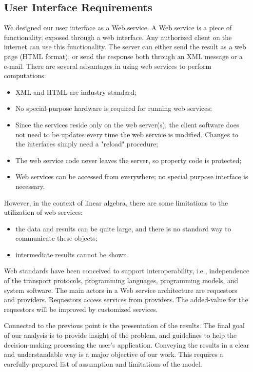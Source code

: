 \documentclass[11pt,relax]{SANDreport}
\begin{document}
\subsection{User Interface Requirements}

We designed our user interface as a Web service.
A Web service is a piece of functionality, exposed through a web interface.
Any authorized client on the internet can use this functionality. The server
can either send the result as a web page (HTML format), or send the response
both through an XML message or a e-mail. There are several advantages in using
web services to perform computations:
\begin{itemize}
\item XML and HTML are industry standard;
\item No special-purpose hardware is required for running web services;
\item Since the services reside only on the web server(s), the client software
does not need to be updates every time the web service is modified. Changes to
the interfaces simply need a "reload" procedure;
\item The web service code never leaves the server, so property code is
protected;
\item Web services can be accessed from everywhere; no special
purpose interface is necessary.
\end{itemize}
However, in the context of linear algebra, there are some limitations to the
utilization of web services:
\begin{itemize}
\item the data and results can be quite large, and there is no standard way to
communicate these objects;
\item intermediate results cannot be shown.
\end{itemize}

Web standards have been conceived to support interoperability, i.e.,
    independence of the transport protocols, programming languages,
    programming models, and system software. The main actors in a Web service
    architecture are requestors and providers. Requestors access services from
    providers. The added-value for the requestors will be improved by
    customized services.

Connected to the previous point is the presentation of the results. The final
goal of our analysis is to provide insight of the problem, and guidelines to
help the decision-making processing the user's application. Conveying the
results in a clear and understandable way is a major objective of our work.
This requires a carefully-prepared list of assumption and limitations of the
model.
\end{document}
